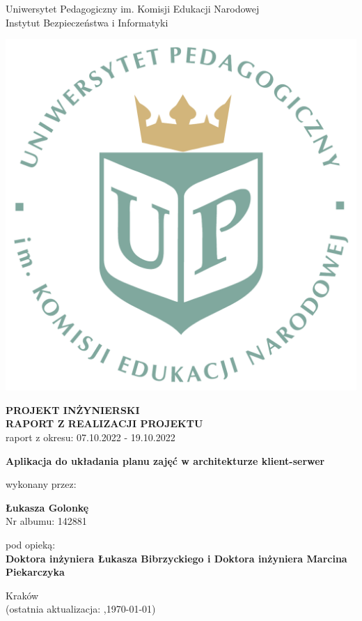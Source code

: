 \documentclass[12pt,a4paper,oneside]{article}
\theoremstyle{definition}
\numberwithin{equation}{section}
\begin{document}

\thispagestyle{empty}
\begin{titlepage}
\begin{center}\Large
Uniwersytet Pedagogiczny im. Komisji Edukacji Narodowej \\
\large
Instytut Bezpieczeństwa i Informatyki\\
\vskip 10pt
\end{center}
\begin{center}
\centering \includegraphics[width=0.4\columnwidth]{../resources/images/logoUP_pl.pdf}
\end{center}

\begin{center}
 {\bf \fontsize{14pt}{14pt}\selectfont PROJEKT INŻYNIERSKI \\ RAPORT Z REALIZACJI PROJEKTU\\
 }
 {\fontsize{12pt}{12pt} raport z okresu: 07.10.2022 - 19.10.2022}
\end{center}
\vskip 5pt
\begin{center}
 {\bf \fontsize{22pt}{22pt}\selectfont Aplikacja do układania planu zajęć w architekturze klient-serwer}
\end{center}

\begin{center}
 {\fontsize{12pt}{12pt}\selectfont wykonany przez: }
\end{center}
\begin{center}
 {\bf\fontsize{16pt}{16pt}\selectfont Łukasza Golonkę}\\
 {\fontsize{12pt}{12pt}\selectfont Nr albumu: 142881 \\}
\end{center}
\begin{center}
 {\fontsize{12pt}{12pt}\selectfont pod opieką:}\\
 {\bf\fontsize{12pt}{12pt}\selectfont Doktora inżyniera Łukasza Bibrzyckiego i Doktora inżyniera Marcina Piekarczyka}
\end{center}

\vspace*{\fill}
\begin{center}
\large
Kraków \the\year\\
(ostatnia aktualizacja: \DTMcurrenttime,\;\today)
\end{center}
\end{titlepage}
\setcounter{page}{0} 
\newpage\null\thispagestyle{empty}
\end{document}
